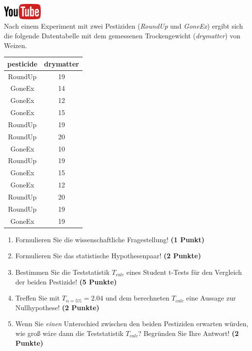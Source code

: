 \documentclass[a4paper, 10pt]{scrartcl}\usepackage[]{graphicx}\usepackage[]{xcolor}
\begin{document}
\hfill\href{https://youtu.be/Cq_rF_z4xOk}{\includegraphics[width =
  2cm]{img/youtube}}\\[1Ex]

Nach einem Experiment mit zwei Pestiziden (\textit{RoundUp} und
\textit{GoneEx}) ergibt sich die folgende Datentabelle mit dem gemessenen
Trockengewicht (\textit{drymatter}) von Weizen.

\begin{table}[!h]
\centering
\begin{tabular}{cc}
\toprule
pesticide & drymatter\\
\midrule
RoundUp & 19\\
GoneEx & 14\\
GoneEx & 12\\
GoneEx & 15\\
RoundUp & 19\\
\addlinespace
RoundUp & 20\\
GoneEx & 10\\
RoundUp & 19\\
GoneEx & 15\\
GoneEx & 12\\
\addlinespace
RoundUp & 20\\
RoundUp & 19\\
GoneEx & 19\\
\bottomrule
\end{tabular}
\end{table}



\begin{enumerate}
  \item Formulieren Sie die wissenschaftliche Fragestellung! \textbf{(1 Punkt)}
  \item Formulieren Sie das statistische Hypothesenpaar! \textbf{(2
      Punkte)}
  \item Bestimmen Sie die Teststatistik $T_{calc}$ eines Student t-Tests f{\"u}r den
  Vergleich der beiden Pestizide! \textbf{(5 Punkte)}
\item Treffen Sie mit $T_{\alpha = 5\%} = 2.04$ und dem berechneten $T_{calc}$ eine Aussage
  zur Nullhypothese! \textbf{(2 Punkte)}
\item Wenn Sie \textit{einen} Unterschied zwischen den beiden
  Pestiziden erwarten w{\"u}rden, wie gro{\ss} w{\"a}re dann die Teststatistik
  $T_{calc}$? Begr{\"u}nden Sie Ihre Antwort! \textbf{(2 Punkte)}
\end{enumerate} 
\clearpage
\end{document}
